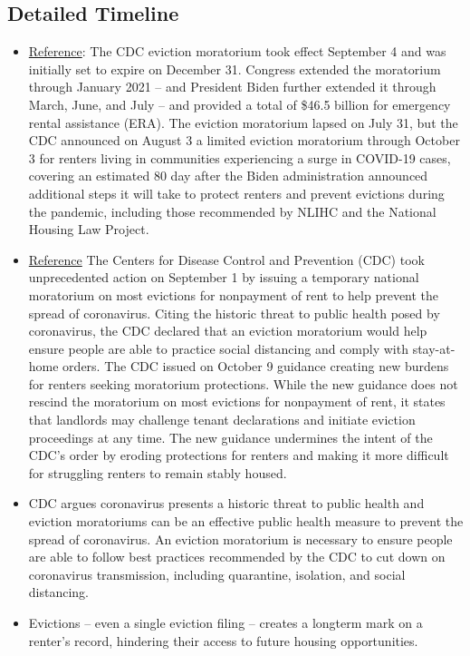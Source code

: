 \documentclass[a4paper,12pt]{article}
\begin{document}
\subsection{Detailed Timeline}
\begin{itemize}
    \item \href{https://nlihc.org/sites/default/files/Overview-of-National-Eviction-Moratorium.pdf}{Reference}: The CDC eviction moratorium took effect September 4 and was initially set to expire on December 31.
Congress extended the moratorium through January 2021 – and President Biden further extended it
through March, June, and July – and provided a total of \$46.5 billion for emergency rental assistance
(ERA). The eviction moratorium lapsed on July 31, but the CDC announced on August 3 a limited eviction
moratorium through October 3 for renters living in communities experiencing a surge in COVID-19 cases,
covering an estimated 80%
day after the Biden administration announced additional steps it will take to protect renters and prevent
evictions during the pandemic, including those recommended by NLIHC and the National Housing Law
Project.
 
    \item \href{https://nlihc.org/sites/default/files/Overview-of-National-Eviction-Moratorium.pdf}{Reference} The Centers for Disease Control and Prevention (CDC) took unprecedented action on September 1 by
issuing a temporary national moratorium on most evictions for nonpayment of rent to help prevent
the spread of coronavirus. Citing the historic threat to public health posed by coronavirus, the CDC
declared that an eviction moratorium would help ensure people are able to practice social distancing
and comply with stay-at-home orders. The CDC issued on October 9 guidance creating new burdens
for renters seeking moratorium protections. While the new guidance does not rescind the moratorium
on most evictions for nonpayment of rent, it states that landlords may challenge tenant declarations and
initiate eviction proceedings at any time. The new guidance undermines the intent of the CDC’s order by
eroding protections for renters and making it more difficult for struggling renters to remain stably housed.
\item CDC argues coronavirus presents a historic threat to public health and eviction
moratoriums can be an effective public health measure to prevent the spread of coronavirus. An eviction
moratorium is necessary to ensure people are able to follow best practices recommended by the CDC to
cut down on coronavirus transmission, including quarantine, isolation, and social distancing. 
\item Evictions – even a single eviction filing – creates a longterm mark on a renter’s record, hindering their access to future housing opportunities.
\end{itemize}
\end{document}

